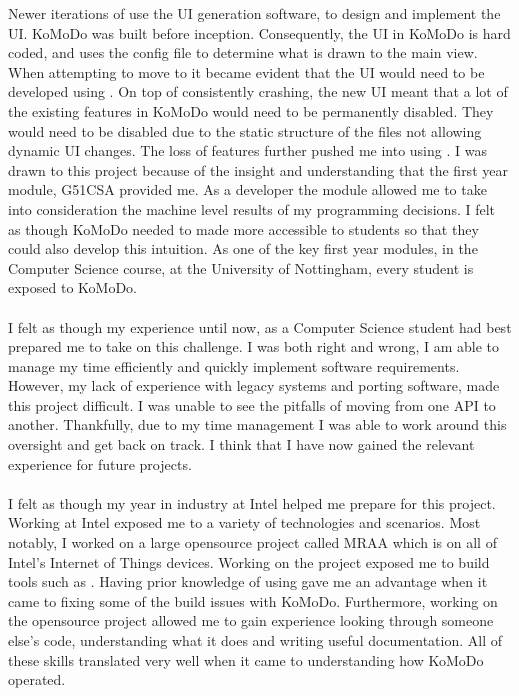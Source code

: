 %
Newer iterations of  use the UI generation software,  to design and implement the UI. KoMoDo was built before  inception. Consequently, the UI in KoMoDo is hard coded, and uses the  config file to determine what is drawn to the main view. When attempting to move to  it became evident that the UI would need to be developed using . On top of  consistently crashing, the new UI meant that a lot of the existing features in KoMoDo would need to be permanently disabled. They would need to be disabled due to the static structure of the  files not allowing dynamic UI changes. The loss of features further pushed me into using .
%
%
%
%
I was drawn to this project because of the insight and understanding that the first year module, G51CSA provided me. As a developer the module allowed me to take into consideration the machine level results of my programming decisions. I felt as though KoMoDo needed to made more accessible to students so that they could also develop this intuition. As one of the key first year modules, in the Computer Science course, at the University of Nottingham, every student is exposed to KoMoDo.\\\\
%
I felt as though my experience until now, as a Computer Science student had best prepared me to take on this challenge. I was both right and wrong, I am able to manage my time efficiently and quickly implement software requirements. However, my lack of experience with legacy systems and porting software, made this project difficult. I was unable to see the pitfalls of moving from one API to another. Thankfully, due to my time management I was able to work around this oversight and get back on track. I think that I have now gained the relevant experience for future projects.\\\\
%
I felt as though my year in industry at Intel helped me prepare for this project. Working at Intel exposed me to a variety of technologies and scenarios. Most notably, I worked on a large opensource project called MRAA which is on all of Intel's Internet of Things devices. Working on the project exposed me to build tools such as . Having prior knowledge of using  gave me an advantage when it came to fixing some of the build issues with KoMoDo. Furthermore, working on the opensource project allowed me to gain experience looking through someone else's code, understanding what it does and writing useful documentation. All of these skills translated very well when it came to understanding how KoMoDo operated.\\\\
